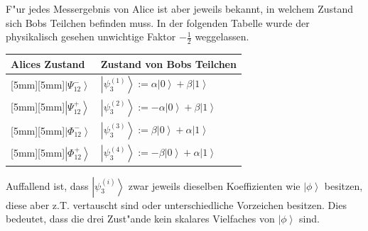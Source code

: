\begin{refsection}
F"ur jedes Messergebnis von Alice ist aber jeweils bekannt, in welchem Zustand sich Bobs Teilchen befinden muss. In der folgenden Tabelle wurde der physikalisch gesehen unwichtige Faktor $-\frac{1}{2}$ weggelassen.
\begin{center}
   \begin{tabular}{| l | l |}
   \hline
   Alices Zustand & Zustand von Bobs Teilchen \\
    \hline
     \raisebox{0mm}[5mm][5mm]{}$\left| \Psi_{12}^{-} \right\rangle$ & $ \left| \psi_{3}^{(1)} \right\rangle := \alpha \left| 0 \right \rangle + \beta \left| 1 \right \rangle $ \\ \hline
     \raisebox{-3mm}[5mm][5mm]{}$\left| \Psi_{12}^{+} \right\rangle$ & $ \left| \psi_{3}^{(2)} \right\rangle := -\alpha \left| 0 \right \rangle + \beta \left| 1 \right \rangle $ \\ \hline
     \raisebox{3mm}[5mm][5mm]{}$\left| \Phi_{12}^{-} \right\rangle$ & $ \left| \psi_{3}^{(3)} \right\rangle := \beta \left| 0 \right \rangle + \alpha \left| 1 \right \rangle $ \\ \hline
     \raisebox{0mm}[5mm][5mm]{}$\left| \Phi_{12}^{+} \right\rangle$ & $ \left| \psi_{3}^{(4)} \right\rangle := -\beta \left| 0 \right \rangle + \alpha \left| 1 \right \rangle $ \\ \hline
   \end{tabular}
\end{center}

Auffallend ist, dass $\left| \psi_{3}^{(i)} \right\rangle$ zwar jeweils dieselben Koeffizienten wie $\left| \phi \right\rangle$ besitzen, diese aber z.T. vertauscht sind oder unterschiedliche Vorzeichen besitzen. Dies bedeutet, dass die drei Zust"ande kein skalares Vielfaches von $\left| \phi \right\rangle$ sind.


\end{refsection}

